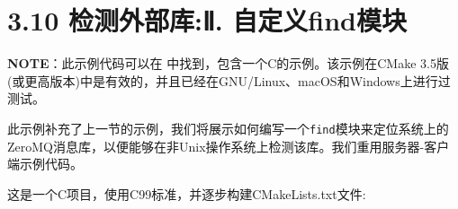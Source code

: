 \section{3.10 检测外部库:Ⅱ. 自定义find模块}

\begin{myInfoBox}
\textbf{NOTE}：此示例代码可以在  中找到，包含一个C的示例。该示例在CMake 3.5版(或更高版本)中是有效的，并且已经在GNU/Linux、macOS和Windows上进行过测试。
\end{myInfoBox}

此示例补充了上一节的示例，我们将展示如何编写一个\texttt{find}模块来定位系统上的ZeroMQ消息库，以便能够在非Unix操作系统上检测该库。我们重用服务器-客户端示例代码。


这是一个C项目，使用C99标准，并逐步构建CMakeLists.txt文件:

